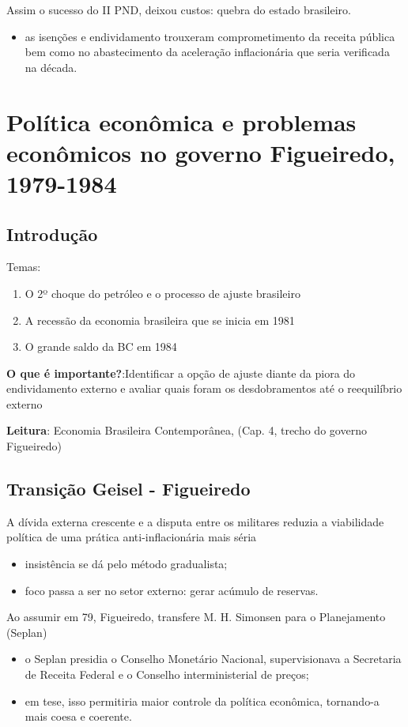 \documentclass[a4paper,12pt]{article}[abntex2]
\begin{document}
Assim o sucesso do II PND, deixou custos: quebra do estado brasileiro. \begin{itemize}
    \item as isenções e endividamento trouxeram comprometimento da receita pública bem como no abastecimento da aceleração inflacionária que seria verificada na década.
\end{itemize}
\newpage

\section{\textbf{Política econômica e problemas econômicos no governo Figueiredo, 1979-1984}}
\subsection{\textbf{Introdução}}
Temas:\begin{enumerate}
    \item O 2º choque do petróleo e o processo de ajuste brasileiro
    \item A recessão da economia brasileira que se inicia em 1981
    \item O grande saldo da BC em 1984
\end{enumerate}

\textbf{O que é importante?}:Identificar a opção de ajuste diante da piora do endividamento externo e avaliar quais foram os desdobramentos até o reequilíbrio externo

\textbf{Leitura}: Economia Brasileira Contemporânea, (Cap. 4, trecho do governo Figueiredo) 

\subsection{\textbf{Transição Geisel - Figueiredo}}
A dívida externa crescente e a disputa entre os militares reduzia a viabilidade política de uma prática anti-inflacionária mais séria\begin{itemize}
    \item insistência se dá pelo método gradualista;
    \item foco passa a ser no setor externo: gerar acúmulo de reservas. 
\end{itemize}

Ao assumir em 79, Figueiredo, transfere M. H. Simonsen para o Planejamento (Seplan)\begin{itemize}
    \item o Seplan presidia o Conselho Monetário Nacional, supervisionava a Secretaria de Receita Federal e o Conselho interministerial de preços;
    \item em tese, isso permitiria maior controle da política econômica, tornando-a mais coesa e coerente.
\end{itemize}
\end{document}
